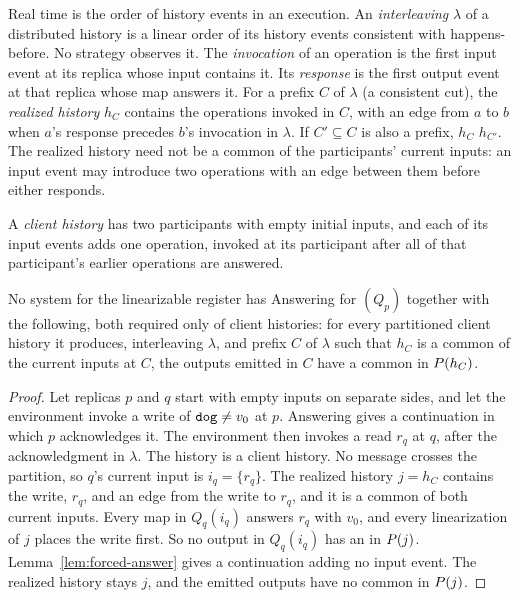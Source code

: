 Real time is the order of history events in an execution.  An
\emph{interleaving} $\lambda$ of a distributed history is a linear order of
its history events consistent with happens-before.  No strategy observes it.
The \emph{invocation} of an operation is the first input event at its replica
whose input contains it.  Its \emph{response} is the first output event at
that replica whose map answers it.  For a prefix $C$ of $\lambda$ (a
consistent cut), the \emph{realized history} $h_C$ contains the operations
invoked in $C$, with an edge from $a$ to $b$ when $a$'s response precedes
$b$'s invocation in $\lambda$.  If $C'\subseteq C$ is also a prefix, $h_C$
\inrel $h_{C'}$.  The realized history need not be a common \indesc of the
participants' current inputs: an input event may introduce two operations with
an edge between them before either responds.

A \emph{client history} has two participants with empty initial inputs, and
each of its input events adds one operation, invoked at its participant after
all of that participant's earlier operations are answered.

\begin{corollary}
\label{cor:gilbert-lynch}
No system for the linearizable register has Answering for $(Q_p)$ together
with the following, both required only of client histories: for every
partitioned client history it produces, interleaving $\lambda$, and prefix $C$
of $\lambda$ such that $h_C$ is a common \indesc of the current inputs at $C$,
the outputs emitted in $C$ have a common \outnoun in $P(h_C)$.
\end{corollary}

\begin{proof}
Let replicas $p$ and $q$ start with empty inputs on separate sides, and let
the environment invoke a write of $\texttt{dog}\neq v_0$ at $p$.  Answering gives a
continuation in which $p$ acknowledges it.  The environment then invokes a read
$r_q$ at $q$, after the acknowledgment in $\lambda$.  The history is a client
history.  No message crosses the partition, so $q$'s current input is
$i_q=\{r_q\}$.  The realized history $j=h_C$ contains the write, $r_q$, and an
edge from the write to $r_q$, and it is a common \indesc of both current
inputs.  Every map in $Q_q(i_q)$ answers $r_q$ with $v_0$, and every
linearization of $j$ places the write first.  So no output in $Q_q(i_q)$ has
an \outnoun in $P(j)$.  Lemma~\ref{lem:forced-answer} gives a
continuation adding no input event.  The realized history stays $j$, and the
emitted outputs have no common \outnoun in $P(j)$.
\end{proof}

